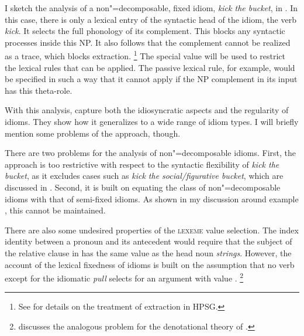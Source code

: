 \documentclass[output=paper
	        ,collection
	        ,collectionchapter
 	        ,biblatex
                ,babelshorthands
                ,newtxmath
                ,draftmode
                ,colorlinks, citecolor=brown
]{langscibook}
\begin{document}
I sketch the analysis of a non"=decomposable, fixed idiom, \emph{kick the bucket}, in . 
In this case, there is only a lexical entry of the syntactic head of the idiom, the verb \emph{kick}. 
It selects the full phonology of its complement. This blocks any syntactic processes inside this NP. It also follows that the complement cannot be realized as a trace, which blocks extraction.%
\footnote{See  for details on the treatment of extraction in HPSG.}
The special  value  will be used to 
restrict the lexical rules that can be applied. 
The passive lexical rule, for example, would be specified in such a way that it cannot apply if the NP complement in its input has this theta-role.


\ea %
\label{ke-kick}
\z 


With this analysis, \citet{KE94a} capture both the idiosyncratic aspects and the regularity of idioms. 
They show how it generalizes to a wide range of idiom types. 
I will briefly mention some problems of the approach, though.

There are two problems for the analysis of non"=decomposable idioms. 
First, the approach is too restrictive with respect to the syntactic flexibility of \emph{kick the bucket}, as it excludes cases such as \emph{kick the social/figurative bucket}, which are discussed in  \citet{Ernst:81}. 
Second, it is built on equating the class of non"=decomposable idioms with that of semi-fixed idioms. As shown in my discussion around example , this cannot be maintained. 

There are also some undesired properties of the \textsc{lexeme} value selection. The index identity between a pronoun and its antecedent would require that the subject of the relative clause in  has the same  value as the head noun \emph{strings}. However, the account of the lexical fixedness of idioms is built on the assumption that no verb except for the idiomatic \emph{pull} selects for an argument with  value .%
\footnote{\citet{Pulman:93} discusses the analogous problem for the denotational theory of \citet{GKPS85a}.}
\end{document}
